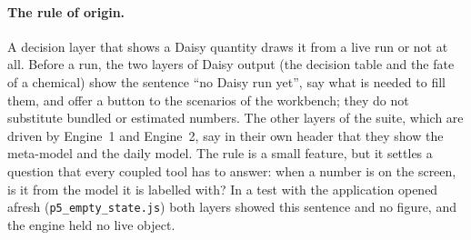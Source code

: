 \documentclass[preprint,12pt]{elsarticle}
\begin{document}
\paragraph{The rule of origin.}
A decision layer that shows a Daisy quantity draws it from a live run or not at all. Before a run, the two layers of Daisy output (the decision table and the fate of a chemical) show the sentence ``no Daisy run yet'', say what is needed to fill them, and offer a button to the scenarios of the workbench; they do not substitute bundled or estimated numbers. The other layers of the suite, which are driven by Engine~1 and Engine~2, say in their own header that they show the meta-model and the daily model. The rule is a small feature, but it settles a question that every coupled tool has to answer: when a number is on the screen, is it from the model it is labelled with? In a test with the application opened afresh (\texttt{p5\_empty\_state.js}) both layers showed this sentence and no figure, and the engine held no live object.
\end{document}
